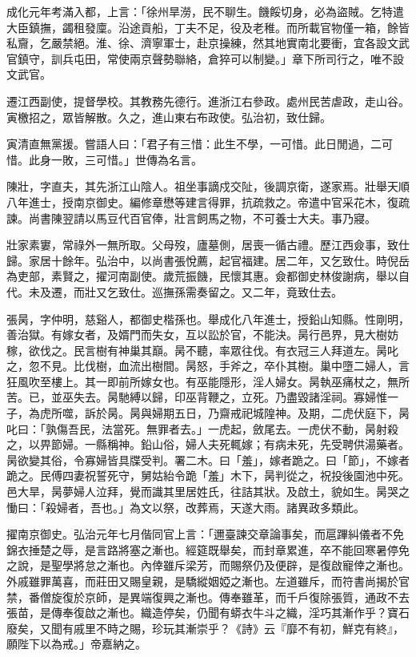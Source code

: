 \begin{pinyinscope}
成化元年考滿入都，上言：「徐州旱澇，民不聊生。饑餒切身，必為盜賊。乞特遣大臣鎮撫，蠲租發廩。沿途貢船，丁夫不足，役及老稚。而所載官物僅一箱，餘皆私齎，乞嚴禁絕。淮、徐、濟寧軍士，赴京操練，然其地實南北要衝，宜各設文武官鎮守，訓兵屯田，常使兩京聲勢聯絡，倉猝可以制變。」章下所司行之，唯不設文武官。

遷江西副使，提督學校。其教務先德行。進浙江右參政。處州民苦虐政，走山谷。寅檄招之，眾皆解散。久之，進山東右布政使。弘治初，致仕歸。

寅清直無黨援。嘗語人曰：「君子有三惜：此生不學，一可惜。此日閒過，二可惜。此身一敗，三可惜。」世傳為名言。

陳壯，字直夫，其先浙江山陰人。祖坐事謫戍交阯，後調京衛，遂家焉。壯舉天順八年進士，授南京御史。編修章懋等建言得罪，抗疏救之。帝遣中官采花木，復疏諫。尚書陳翌請以馬豆代百官俸，壯言飼馬之物，不可養士大夫。事乃寢。

壯家素寠，常祿外一無所取。父母歿，廬墓側，居喪一循古禮。歷江西僉事，致仕歸。家居十餘年。弘治中，以尚書張悅薦，起官福建。居二年，又乞致仕。時倪岳為吏部，素賢之，擢河南副使。歲荒振饑，民懷其惠。僉都御史林俊謝病，舉以自代。未及遷，而壯又乞致仕。巡撫孫需奏留之。又二年，竟致仕去。

張昺，字仲明，慈谿人，都御史楷孫也。舉成化八年進士，授鉛山知縣。性剛明，善治獄。有嫁女者，及婿門而失女，互以訟於官，不能決。昺行邑界，見大樹妨稼，欲伐之。民言樹有神巢其巔。昺不聽，率眾往伐。有衣冠三人拜道左。昺叱之，忽不見。比伐樹，血流出樹間。昺怒，手斧之，卒仆其樹。巢中墮二婦人，言狂風吹至樓上。其一即前所嫁女也。有巫能隱形，淫人婦女。昺執巫痛杖之，無所苦。已，並巫失去。昺馳縛以歸，印巫背鞭之，立死。乃盡毀諸淫祠。寡婦惟一子，為虎所噬，訴於昺。昺與婦期五日，乃齋戒祀城隍神。及期，二虎伏庭下，昺叱曰：「孰傷吾民，法當死。無罪者去。」一虎起，斂尾去。一虎伏不動，昺射殺之，以畀節婦。一縣稱神。鉛山俗，婦人夫死輒嫁；有病未死，先受聘供湯藥者。昺欲變其俗，令寡婦皆具牒受判。署二木。曰「羞」，嫁者跪之。曰「節」，不嫁者跪之。民傅四妻祝誓死守，舅姑紿令跪「羞」木下，昺判從之，祝投後園池中死。邑大旱，昺夢婦人泣拜，覺而識其里居姓氏，往詰其狀。及啟土，貌如生。昺哭之慟曰：「殺婦者，吾也。」為文以祭，改葬焉，天遂大雨。諸異政多類此。

擢南京御史。弘治元年七月偕同官上言：「邇臺諫交章論事矣，而扈蹕糾儀者不免錦衣捶楚之辱，是言路將塞之漸也。經筵既舉矣，而封章累進，卒不能回寒暑停免之說，是聖學將怠之漸也。內倖雖斥梁芳，而賜祭仍及便辟，是復啟寵倖之漸也。外戚雖罪萬喜，而莊田又賜皇親，是驕縱姻婭之漸也。左道雖斥，而符書尚揭於官禁，番僧旋復於京師，是異端復興之漸也。傳奉雖革，而千戶復除張質，通政不去張苗，是傳奉復啟之漸也。織造停矣，仍聞有蟒衣牛斗之織，淫巧其漸作乎？寶石廢矣，又聞有戚里不時之賜，珍玩其漸崇乎？《詩》云『靡不有初，鮮克有終』，願陛下以為戒。」帝嘉納之。


\end{pinyinscope}
